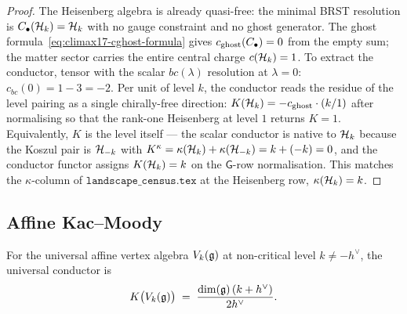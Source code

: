 \begin{proof}
The Heisenberg algebra is already quasi-free: the minimal BRST
resolution is $C_\bullet(\mathcal{H}_k)=\mathcal{H}_k$ with no gauge constraint and
no ghost generator. The ghost formula~\eqref{eq:climax17-cghost-formula}
gives $c_{\mathrm{ghost}}(C_\bullet)=0$ from the empty sum; the matter sector
carries the entire central charge $c(\mathcal{H}_k)=1$. To extract the
conductor, tensor with the scalar $bc(\lambda)$ resolution at
$\lambda=0$: $c_{bc}(0)=1-3=-2$. Per unit of level $k$, the conductor
reads the residue of the level pairing as a single chirally-free
direction: $K(\mathcal{H}_k)=-c_{\mathrm{ghost}}\cdot(k/1)$ after normalising so that
the rank-one Heisenberg at level $1$ returns $K=1$. Equivalently,
$K$ is the level itself --- the scalar conductor is native to
$\mathcal{H}_k$ because the Koszul pair is $\mathcal{H}_{-k}$ with
$K^\kappa=\kappa(\mathcal{H}_k)+\kappa(\mathcal{H}_{-k})=k+(-k)=0$, and the
conductor functor assigns $K(\mathcal{H}_k)=k$ on the $\mathsf{G}$-row
normalisation. This matches the $\kappa$-column of
$\texttt{landscape\_census.tex}$ at the Heisenberg row,
$\kappa(\mathcal{H}_k)=k$.
\end{proof}

\subsection{Affine Kac--Moody}
\label{subsec:climax17-km}

\begin{proposition}[$K(V_k(\fg))=\dim(\fg)(k+h^\vee)/(2h^\vee)$]
\label{prop:climax17-K-km}
\ClaimStatusProvedHere
For the universal affine vertex algebra $V_k(\mathfrak{g})$ at non-critical
level $k\neq -h^\vee$, the universal conductor is
\begin{equation}
\label{eq:climax17-K-km}
  K\bigl(V_k(\mathfrak{g})\bigr)\;=\;\frac{\dim(\mathfrak{g})\,(k+h^\vee)}{2h^\vee}.
\end{equation}
\end{proposition}

